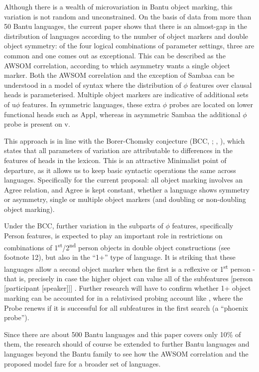 \documentclass[output=paper
,modfonts
,nonflat]{langsci/langscibook}
\begin{document}
Although there is a wealth of microvariation in Bantu object marking, this variation is not random and unconstrained. On the basis of data from more than 50 Bantu languages, the current paper shows that there is an almost-gap in the distribution of languages according to the number of object markers and double object symmetry: of the four logical combinations of parameter settings, three are common and one comes out as exceptional. This can be described as the AWSOM correlation, according to which asymmetry wants a single object marker. Both the AWSOM correlation and the exception of Sambaa can be understood in a model of syntax where the distribution of $\phi$ features over clausal heads is parameterised. Multiple object markers are indicative of additional sets of u$\phi$ features. In symmetric languages, these extra $\phi$ probes are located on lower functional heads such as Appl, whereas in asymmetric Sambaa the additional $\phi$ probe is present on v. 

This approach is in line with the Borer-Chomsky conjecture (BCC, \citealt{Baker2008}; \citealt{Borer1984}, \citealt{Chomsky1995}), which states that all parameters of variation are attributable to differences in the features of heads in the lexicon. This is an attractive Minimalist point of departure, as it allows us to keep basic syntactic operations the same across languages. Specifically for the current proposal: all object marking involves an Agree relation, and Agree is kept constant, whether a language shows symmetry or asymmetry, single or multiple object markers (and doubling or non-doubling object marking).

Under the BCC, further variation in the subparts of $\phi$ features, specifically Person features, is expected to play an important role in restrictions on combinations of 1\textsuperscript{st}/2\textsuperscript{nd} person objects in double object constructions (see footnote 12), but also in the “1+” type of language. It is striking that these languages allow a second object marker when the first is a reflexive or 1\textsuperscript{st} person - that is, precisely in case the higher object can value all of the subfeatures [person [participant [speaker]]] \citep{Bejar_Rezac2009}. Further research will have to confirm whether 1+ object marking can be accounted for in a relativised probing account like \citet{Bejar_Rezac2009}, where the Probe renews if it is successful for all subfeatures in the first search (a “phoenix probe”).

Since there are about 500 Bantu languages and this paper covers only 10\% of them, the research should of course be extended to further Bantu languages and languages beyond the Bantu family to see how the AWSOM correlation and the proposed model fare for a broader set of languages.
\end{document}

